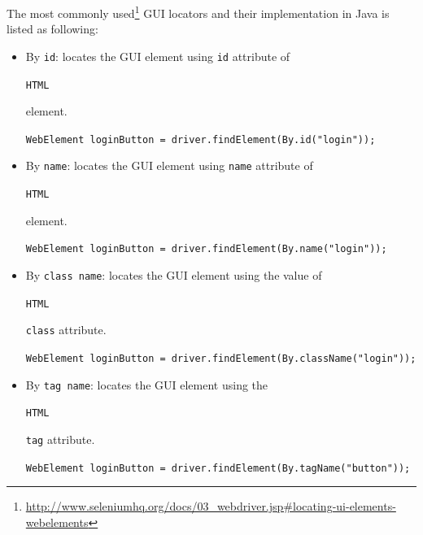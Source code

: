 The most commonly  used\footnote{\url{http://www.seleniumhq.org/docs/03_webdriver.jsp\#locating-ui-elements-webelements}} GUI locators and their implementation in Java is listed as following:
\begin{itemize}
\item 
By \texttt{id}:
locates the GUI element using \texttt{id} attribute of\begin{small} \texttt{HTML}\end{small} element.
\newline
\begin{footnotesize}
\texttt{WebElement loginButton = driver.findElement(By.id("login"));
}
\end{footnotesize}
\item 
By \texttt{name}:
locates the GUI element using \texttt{name} attribute of\begin{small} \texttt{HTML}\end{small} element.
\newline
\begin{footnotesize}
\texttt{WebElement loginButton = driver.findElement(By.name("login"));
}
\end{footnotesize}
\item 
By \texttt{class name}:
locates the GUI element using the value of \begin{small}\texttt{HTML}\end{small} \texttt{class} attribute.
\newline
\begin{footnotesize}
\texttt{WebElement loginButton = driver.findElement(By.className("login"));
}
\end{footnotesize}

\item 
By \texttt{tag name}:
locates the GUI element using the \begin{small}\texttt{HTML}\end{small} \texttt{tag} attribute.
\newline
\begin{footnotesize}
\texttt{WebElement loginButton = driver.findElement(By.tagName("button"));
}
\end{footnotesize}


\end{itemize}
